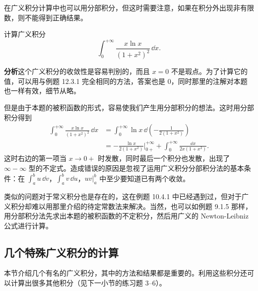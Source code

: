 在广义积分计算中也可以用分部积分，但这时需要注意，如果在积分外出现非有限数，则不能得到正确结果。

\begin{xexample}[12.3.3]
计算广义积分
\[
  \int_0^{+\infty}\frac{x\ln x}{(1+x^2)^2}\,\dd x.
\]
\end{xexample}

\textbf{分析}\quad 这个广义积分的收敛性是容易判别的，而且 $x=0$ 不是瑕点。为了计算它的值，可以用与例题 12.3.1 完全相同的方法，答案也是 0，同时那里的注解对本题也一样有效，细节从略。

但是由于本题的被积函数的形式，容易使我们产生用分部积分的想法。这时用分部积分得到
\begin{align*}
  \int_0^{+\infty}\frac{x\ln x}{(1+x^2)^2}\,\dd x
  &=\int_0^{+\infty}\ln x\,\dd\left(-\frac1{2(1+x^2)}\right)\\
  &=-\frac{\ln x}{2(1+x^2)}\bigg|_{0+}^{+\infty}
  +\int_0^{+\infty}\frac{\dd x}{2x(1+x^2)}.
\end{align*}
这时右边的第一项当 $x\to0+$ 时发散，同时最后一个积分也发散，出现了 $\infty-\infty$ 型的不定式。造成错误的原因是忽视了运用广义积分分部积分法的基本条件：在 $\int_a^b u\,\dd v$，$\int_a^b v\,\dd u$，$uv\big|_a^b$ 中至少要知道已有两个收敛。

\begin{xremark}
类似的问题对于常义积分也是存在的，这在例题 10.4.1 中已经遇到过，但对于广义积分却难以用那里介绍的待定常数法来解决。当然，也可以如例题 9.1.5 那样，用分部积分法先求出本题的被积函数的不定积分，然后用广义的 Newton-Leibniz 公式进行计算。
\end{xremark}

\subsection{几个特殊广义积分的计算}

本节介绍几个有名的广义积分，其中的方法和结果都是重要的。利用这些积分还可以计算出很多其他积分（见下一小节的练习题 3--6）。

